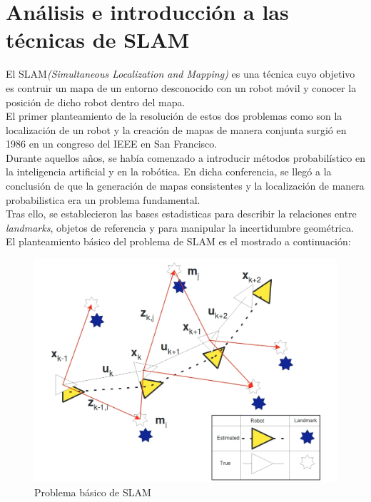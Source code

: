 \section{Análisis e introducción a las técnicas de SLAM}
El SLAM\textit{(Simultaneous Localization and Mapping)} es una técnica cuyo objetivo es contruir un mapa de un entorno desconocido con un robot móvil 
y conocer la posición de dicho robot dentro del mapa. \\
El primer planteamiento de la resolución de estos dos problemas como son la localización de un robot y la creación de mapas de manera conjunta surgió 
en 1986 en un congreso del IEEE en San Francisco. \\
Durante aquellos años, se había comenzado a introducir métodos probabilístico en la inteligencia artificial 
y en la robótica. En dicha conferencia, se llegó a la conclusión de que la generación de mapas consistentes y la localización de manera probabilistica era
un problema fundamental.\\

Tras ello, se establecieron las bases estadisticas para describir la relaciones entre \textit{landmarks}, objetos de referencia y 
para manipular la incertidumbre geométrica. \\
El planteamiento básico del problema de SLAM es el mostrado a continuación:
\begin{figure}[h!]
    \centering
    \includegraphics[width=.6\textwidth]{images/slam_prob}
    \caption{Problema básico de SLAM}
\end{figure}

